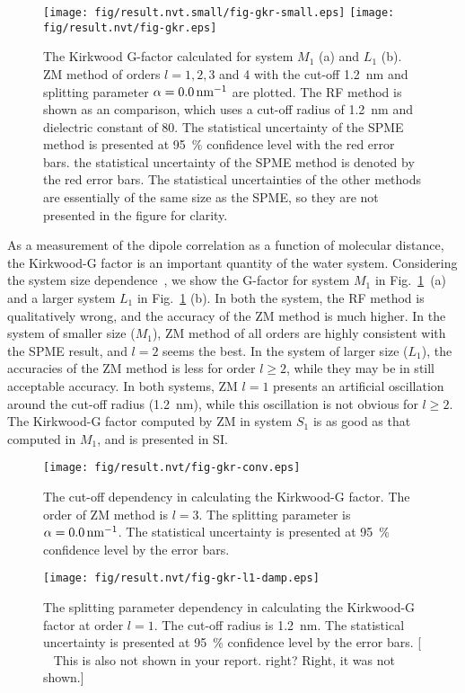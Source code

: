 \documentclass[a4paper,preprint,unsortedaddress,onecolumn,fleqn]{revtex4}
\newcommand{\recheck}[1]{{\color{red} #1}}
\begin{document}
\begin{figure}[tbp]
\centering
\texttt{[image: fig/result.nvt.small/fig-gkr-small.eps]}\newline
\texttt{[image: fig/result.nvt/fig-gkr.eps]}
\caption{The Kirkwood G-factor calculated for system $M_{1}$ (a) and $L_{1} $
(b). ZM method of orders $l=1,2,3$ and 4 with the cut-off 1.2~nm and
splitting parameter $\protect\alpha =0.0\,\text{nm}^{-1}$ are plotted. The
RF method is shown as an comparison, which uses a cut-off radius of 1.2~nm
and dielectric constant of 80. The statistical uncertainty of the SPME
method is presented at 95~\% confidence level with the red error bars. the
statistical uncertainty of the SPME method is denoted by the red error bars.
The statistical uncertainties of the other methods are essentially of the
same size as the SPME, so they are not presented in the figure for clarity.}
\label{fig:gkr}
\end{figure}

As a measurement of the dipole correlation as a function of molecular
distance, the Kirkwood-G factor is an important quantity of the water
system. Considering the system size dependence~\cite{vanderSpoel2006origin},
we show the G-factor for system $M_{1}$ in Fig.~\ref{fig:gkr}~(a) and a
larger system $L_{1}$ in Fig.~\ref{fig:gkr} (b). In both the system, the RF
method is qualitatively wrong, and the accuracy of the ZM method is much
higher. In the system of smaller size ($M_{1}$), ZM method of all orders are
highly consistent with the SPME result, and $l=2$ seems the best. In the
system of larger size ($L_{1}$), the accuracies of the ZM method is less for
order $l\geq 2$, while they may be in still acceptable accuracy. In both
systems, ZM $l=1$ presents an artificial oscillation around the cut-off
radius (1.2~nm), while this oscillation is not obvious for $l\geq 2$.
\recheck{
  The Kirkwood-G factor computed by ZM in system $S_1$ is as good as that computed in $M_1$,
  and is presented in SI.}

\begin{figure}[tbp]
\centering
\texttt{[image: fig/result.nvt/fig-gkr-conv.eps]}
\caption{ The cut-off dependency in calculating the Kirkwood-G factor. The
order of ZM method is $l=3$. The splitting parameter is $\protect\alpha %
=0.0\,\text{nm}^{-1}$. The statistical uncertainty is presented at 95~\%
confidence level by the error bars. }
\label{fig:gkr-conv}
\end{figure}

\begin{figure}[tbp]
\centering
\texttt{[image: fig/result.nvt/fig-gkr-l1-damp.eps]}
\caption{ The splitting parameter dependency in calculating the Kirkwood-G
factor at order $l=1$. The cut-off radius is 1.2~nm. The statistical
uncertainty is presented at 95~\% confidence level by the error bars. [ {\ 
\color{blue} This is also not shown in your report. right? } \recheck{Right, it was not shown.}]}
\label{fig:gkr-damp-l1}
\end{figure}
\end{document}
